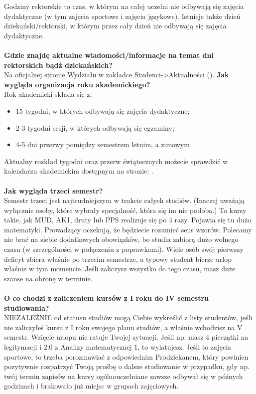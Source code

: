 \documentclass[11pt]{article}
\begin{document}
Godziny rektorskie to czas, w którym na całej uczelni nie odbywają się zajęcia dydaktyczne (w tym zajęcia sportowe i zajęcia językowe). Istnieje także dzień dziekański/rektorski, w którym przez cały dzień nie odbywają się zajęcia dydaktyczne. \\\\
\textbf{Gdzie znajdę aktualne wiadomości/informacje na temat dni rektorskich bądź dziekańskich?}\\
\indent Na oficjalnej stronie Wydziału w zakładce Studenci->Aktualności ({}).
\newpage
\noindent \textbf{Jak wygląda organizacja roku akademickiego?}\\
\indent Rok akademicki składa się z:
\begin{itemize}
    \item 15 tygodni, w których odbywają się zajęcia dydaktyczne;
    \item 2-3 tygodni sesji, w których odbywają się egzaminy;
    \item 4-5 dni przerwy pomiędzy semestrem letnim, a zimowym
\end{itemize}
\indent \hspace{0.5cm} Aktualny rozkład tygodni oraz przerw świątecznych możecie sprawdzić w kalendarzu akademickim dostępnym na stronie:
{}.\\\\
\textbf{Jak wygląda trzeci semestr?}\\
\indent Semestr trzeci jest najtrudniejszym w trakcie całych studiów. (Inaczej uważają wyłącznie osoby, które wybrały specjalność, która się im nie podoba.) To kursy takie, jak MUD, AK1, druty lub PPS realizuje się po 4 razy. Pojawia się tu dużo matematyki. Prowadzący oczekują, że będziecie rozumieć sens wzorów. Polecamy nie brać na siebie dodatkowych obowiązków, bo studia zabiorą dużo wolnego czasu (w szczególności w połączeniu z poprawkami). Wiele osób swój pierwszy deficyt zbiera właśnie po trzecim semestrze, a typowy student bierze urlop właśnie w tym momencie. Jeśli zaliczysz wszystko do tego czasu, masz duże szanse na obronę w terminie. \\\\
\textbf{O co chodzi z zaliczeniem kursów z I roku do IV semestru studiowania?}\\
\indent NIEZALEŻNIE od statusu studiów mogą Ciebie wykreślić z listy studentów, jeśli nie zaliczyłeś kursu z I roku swojego planu studiów, a właśnie wchodzisz na V semestr. Wzięcie urlopu nie ratuje Twojej sytuacji. Jeśli np. masz 4 pieczątki na legitymacji i 2.0 z Analizy matematycznej 1, to wylatujesz. Jeśli to zajęcia sportowe, to trzeba porozmawiać z odpowiednim Prodziekanem, który powinien pozytywnie rozpatrzyć Twoją prośbę o dalsze studiowanie w przypadku, gdy np. twój termin zapisów na kursy ogólnouczelniane zawsze odbywał się w późnych godzinach i brakowało już miejsc w grupach zajęciowych. \\\\
\end{document}
